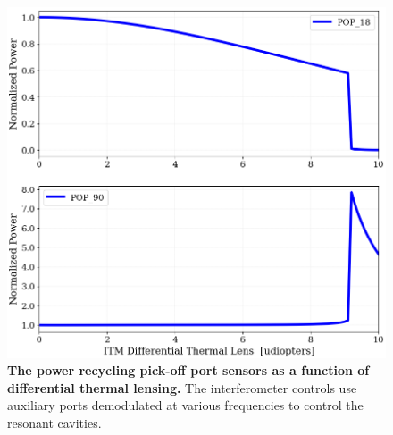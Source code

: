 \begin{figure}[ht]
	\centering
	\includegraphics[width=.6 \textwidth]{../Figures/POP18_POP90_DiffLens.png}
	\caption[The power recycling pick-off port sensors as a function of differential thermal lensing.]  
	{\textbf{The power recycling pick-off port sensors as a function of differential thermal lensing.}
	The interferometer controls use auxiliary ports demodulated at various frequencies to control the resonant cavities. }
	\label{fig:POP18_POP90}
\end{figure}